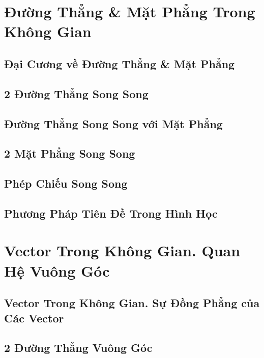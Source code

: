 \documentclass[oneside]{book}
\numberwithin{equation}{section}
\begin{document}

\chapter{Đường Thẳng \& Mặt Phẳng Trong Không Gian}

\section{Đại Cương về Đường Thẳng \& Mặt Phẳng}

\section{2 Đường Thẳng Song Song}

\section{Đường Thẳng Song Song với Mặt Phẳng}

\section{2 Mặt Phẳng Song Song}

\section{Phép Chiếu Song Song}

\section{Phương Pháp Tiên Đề Trong Hình Học}


\chapter{Vector Trong Không Gian. Quan Hệ Vuông Góc}

\section{Vector Trong Không Gian. Sự Đồng Phẳng của Các Vector}

\section{2 Đường Thẳng Vuông Góc}
\end{document}
